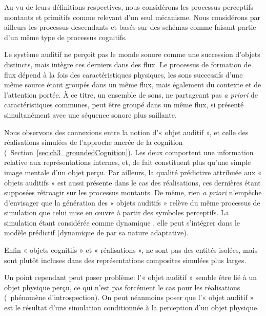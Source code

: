 Au vu de leurs définitions respectives, nous considérons les processus perceptifs montants et primitifs comme relevant d'un seul mécanisme. Nous considérons par ailleurs les processus descendants et basés sur des schémas comme faisant partie d'un même type de processus cognitifs.

Le système auditif ne perçoit pas le monde sonore comme une succession d'objets distincts, mais intègre ces derniers dans des flux. Le processus de formation de flux dépend à la fois des caractéristiques physiques, les sons successifs d'une même source étant groupés dans un même flux, mais également du contexte et de l'attention portée. À ce titre, un ensemble de sons, ne partageant pas \emph{a priori} de caractéristiques communes, peut être groupé dans un même flux, si présenté simultanément avec une séquence sonore plus saillante.

Nous observons des connexions entre la notion d'« objet auditif », et celle des réalisations simulées de l'approche ancrée de la cognition (\cf~Section~\ref{sec:ch3_groundedCognition}). Les deux comportent une information relative aux représentations internes, et, de fait constituent plus qu'une simple image mentale d'un objet perçu. Par ailleurs, la qualité prédictive attribuée aux « objets auditifs » est aussi présente dans le cas des réalisations, ces dernières étant supposées rétroagir sur les processus montants. De même, rien \emph{a priori} n'empêche d'envisager que la génération des « objets auditifs » relève du même processus de simulation que celui mise en œuvre à partir des symboles perceptifs. La simulation étant considérée comme dynamique \citep{barsalou1999perceptions}, elle peut s'intégrer dans le modèle prédictif (dynamique de par sa nature adaptative).

Enfin « objets cognitifs » et « réalisations », ne sont pas des entités isolées, mais sont plutôt incluses dans des représentations composites simulées plus larges.

Un point cependant peut poser problème: l'« objet auditif » semble être lié à un objet physique perçu, ce qui n'est pas forcément le cas pour les réalisations (\eg~phénomène d'introspection). On peut néanmoins poser que l'« objet auditif » est le résultat d'une simulation conditionnée à la perception d'un objet physique.

